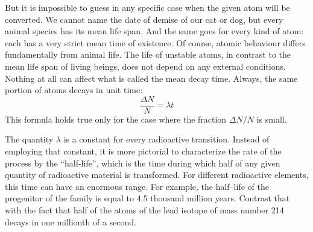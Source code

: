 But it is impossible to guess in any specific case when the given atom will be converted. We cannot name the date of demise of our cat or dog, but every animal species has its mean life span. And the same goes for every kind of atom: each has a very strict mean time of existence. Of course, atomic behaviour differs fundamentally from animal life. The life of unstable atoms, in contrast to the mean life span of living beings, does not depend on any external conditions. Nothing at all can affect what is called the mean decay time. Always, the same portion of atoms decays in unit time:
\begin{equation*}%
\frac{\Delta N}{N} = \lambda t
\end{equation*}
This formula holds true only for the case where the frac­tion ${\Delta N}/{N}$ is small.

The quantity $\lambda$ is a constant for every radioactive transition. Instead of employing that constant, it is more pictorial to characterize the rate of the process by the ``half-life'', which is the time during which half of any given quantity of radioactive material is transformed. For different radioactive elements, this time can have an enormous range. For example, the half--life of the progenitor of the  family is equal to 4.5 thousand million years. Contrast that with the fact that half of the atoms of the lead isotope of mass number 214 decays in one millionth of a second.



